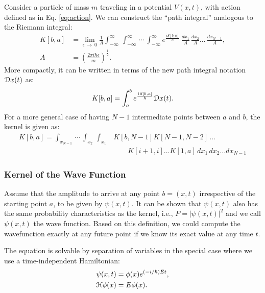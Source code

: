         Consider a particle of mass $m$ traveling in a potential $V(x,t)$, with action defined as in Eq. \eqref{eq:action}. We can construct the ``path integral'' analogous to the Riemann integral:
        \begin{equation}
            \begin{aligned}
                K[b,a] &= \displaystyle\lim_{\epsilon\,\to\ 0} \frac{1}{A}\int_{-\infty}^\infty\,\int_{-\infty}^\infty\,\cdots\,\int_{-\infty}^\infty e^{\frac{iS[b,a]}{\hbar}}\,\frac{dx_1}{A}\,\frac{dx_2}{A}\ldots\,\frac{dx_{N-1}}{A},\\
                A &= {\left( \displaystyle\frac{2\pi i \hbar \epsilon}{m} \right)}^{\frac{1}{2}}.
            \end{aligned}
        \end{equation}
        More compactly, it can be written in terms of the new path integral notation $\mathcal{D} x(t)$ as:
        \begin{equation}
        \label{eq:PI compact kernel}
            K[b,a] = \displaystyle \int_{a}^b e^{\frac{iS[b,a]}{\hbar}} \mathcal{D} x(t).
        \end{equation}
        For a more general case of having $N-1$ intermediate points between $a$ and $b$, the kernel is given as:
        \begin{equation}
            \begin{aligned}
                K[b,a] = \int_{x_{N-1}}\,\cdots\,\int_{x_2}\,\int_{x_1} &K[b,N-1]K[N-1,N-2]\,\ldots\\
                & \qquad K[i+1,i] \ldots K[1,a]\,dx_1\,dx_2\ldots dx_{N-1}
            \end{aligned}
        \end{equation}

        \subsubsection{Kernel of the Wave Function}
            Assume that the amplitude to arrive at any point $b = (x,t)$ irrespective of the starting point $a$, to be given by $\psi (x,t)$. It can be shown that $\psi (x,t)$ also has the same probability characteristics as the kernel, i.e., $P = |\psi (x,t)|^2$ and we call $\psi (x,t)$ the wave function. Based on this definition, we could compute the wavefunction exactly at any future point if we know its exact value at any time $t$.

            The \Schrodinger{} equation is solvable by separation of variables in the special case where we use a time-independent Hamiltonian:
            \begin{equation}
                \label{eq:psi}
                \begin{aligned}
                    \psi(x,t) &= \phi(x)e^{(-i/\hbar)Et},\\
                    \mathcal{H} \phi(x) &= E \phi(x).
                \end{aligned}
            \end{equation}

